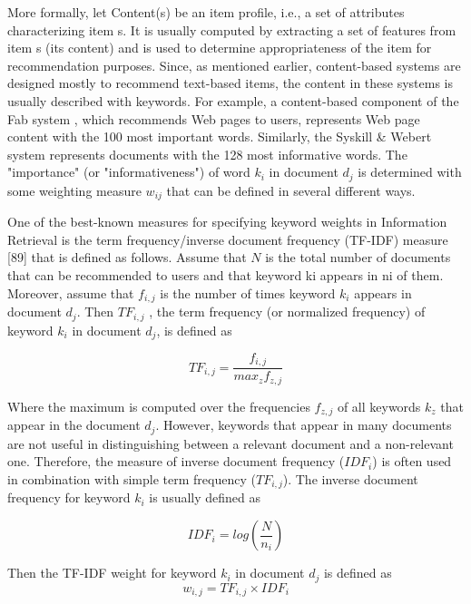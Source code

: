 More formally, let Content(s) be an item profile, i.e., a set of attributes characterizing item s. It is usually computed by extracting a set of features from item s (its content) and is used to determine appropriateness of the item for recommendation purposes. Since, as mentioned earlier, content-based systems are designed mostly to recommend text-based items, the content in these systems is usually described with keywords. For example, a content-based component of the Fab system \citep{recom_8}, which recommends Web pages to users, represents Web page content with the 100 most important words. Similarly, the Syskill \& Webert system \cite{recom_77} represents documents with the 128 most informative words. The "importance" (or "informativeness") of word $k_i$ in document $d_j$ is determined with some weighting measure $w_{ij}$ that can be defined in several different ways.

One of the best-known measures for specifying keyword weights in Information Retrieval is the term frequency/inverse document frequency (TF-IDF) measure [89] that is defined as follows. Assume that $N$ is the total number of documents that can be recommended to users and that keyword ki appears in ni of them. Moreover, assume that $f_{i,j}$  is the number of times keyword $k_i$ appears in document $d_j$. Then $TF_{i,j}$ , the term frequency (or normalized frequency) of keyword $k_i$ in document $d_j$, is defined as

\begin{equation} \label{eq:2}
TF_{i,j} = \frac{f_{i,j}}{max_z f_{z,j}}
\end{equation}

Where the maximum is computed over the frequencies $f_{z,j}$ of all keywords $k_z$ that appear in the document $d_j$. However, keywords that appear in many documents are not useful in distinguishing between a relevant document and a non-relevant one. Therefore, the 
measure of inverse document frequency ($IDF_i$) is often used in combination with simple term frequency ($TF_{i, j}$). The inverse document frequency for keyword $k_i$ is usually defined as

\begin{equation} \label{eq:3}
IDF_i = log(\frac{N}{n_i})
\end{equation}

Then the TF-IDF weight for keyword $k_i$ in document $d_j$ is defined as
\begin{equation} \label{eq:4}
w_{i,j} = TF_{i,j} \times IDF_{i}
\end{equation}

